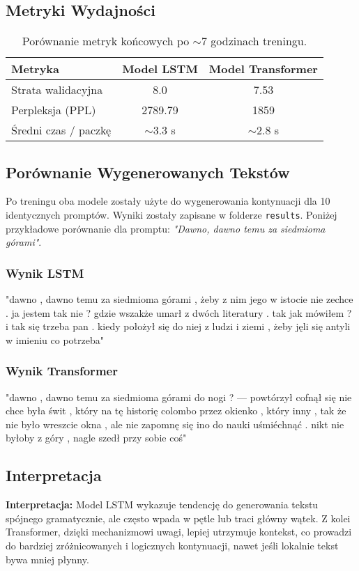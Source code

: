 \documentclass[11pt, a4paper]{article}
\begin{document}
\subsection{Metryki Wydajności}
\begin{table}[H]
\centering
\begin{tabular}{|l|c|c|}
\hline
\textbf{Metryka} & \textbf{Model LSTM} & \textbf{Model Transformer} \\
\hline
Strata walidacyjna & 8.0 & 7.53 \\
\hline
Perpleksja (PPL) & 2789.79 &  1859 \\
\hline
Średni czas / paczkę & $\sim$3.3 s &  $\sim$2.8 s \\
\hline
\end{tabular}
\caption{Porównanie metryk końcowych po  $\sim$7 godzinach treningu.}
\end{table}

\subsection{Porównanie Wygenerowanych Tekstów}
Po treningu oba modele zostały użyte do wygenerowania kontynuacji dla 10 identycznych promptów. Wyniki zostały zapisane w folderze \texttt{results}. Poniżej przykładowe porównanie dla promptu: \textit{"Dawno, dawno temu za siedmioma górami"}.

\subsubsection{Wynik LSTM}
"dawno , dawno temu za siedmioma górami , żeby z nim jego w istocie nie zechce . ja jestem tak nie ? gdzie wszakże umarł z dwóch literatury . tak jak mówiłem ? i tak się trzeba pan . kiedy położył się do niej z ludzi i ziemi , żeby jęli się antyli w imieniu co potrzeba"

\subsubsection{Wynik Transformer}
"dawno , dawno temu za siedmioma górami do nogi ? — powtórzył cofnął się nie chce była świt , który na tę historię colombo przez okienko , który inny , tak że nie było wreszcie okna , ale nie zapomnę się ino do nauki uśmiéchnąć . nikt nie byłoby z góry , nagle szedł przy sobie coś"

\subsection{Interpretacja}
\textbf{Interpretacja:}
Model LSTM wykazuje tendencję do generowania tekstu spójnego gramatycznie, ale często wpada w pętle lub traci główny wątek. Z kolei Transformer, dzięki mechanizmowi uwagi, lepiej utrzymuje kontekst, co prowadzi do bardziej zróżnicowanych i logicznych kontynuacji, nawet jeśli lokalnie tekst bywa mniej płynny.
\end{document}
